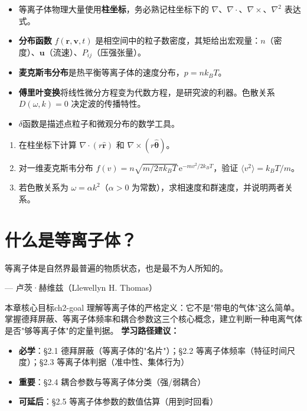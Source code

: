 \documentclass[12pt,a4paper,openany,oneside]{book}
\newcommand{\ee}{\mathrm{e}}
\newcommand{\vect}[1]{\bm{#1}}
\newcommand{\unitvec}[1]{\hat{\vect{#1}}}
\newcommand{\grad}{\nabla}
\newcommand{\curl}{\nabla\times}
\newcommand{\divg}{\nabla\cdot}
\newcommand{\lap}{\nabla^2}
\begin{document}
\begin{chapterreview}
\begin{itemize}
\item 等离子体物理大量使用\textbf{柱坐标}，务必熟记柱坐标下的 $\grad$、$\divg$、$\curl$、$\lap$ 表达式。
\item \textbf{分布函数} $f(\vect{r},\vect{v},t)$ 是相空间中的粒子数密度，其矩给出宏观量：$n$（密度）、$\vect{u}$（流速）、$P_{ij}$（压强张量）。
\item \textbf{麦克斯韦分布}是热平衡等离子体的速度分布，$p=nk_BT$。
\item \textbf{傅里叶变换}将线性微分方程变为代数方程，是研究波的利器。色散关系 $D(\omega,k)=0$ 决定波的传播特性。
\item $\delta$函数是描述点粒子和微观分布的数学工具。
\end{itemize}
\end{chapterreview}

\begin{miniquiz}
\begin{enumerate}
\item 在柱坐标下计算 $\divg(r\unitvec{r})$ 和 $\curl(r\unitvec{\theta})$。
\item 对一维麦克斯韦分布 $f(v) = n\sqrt{m/2\pi k_BT}\,\ee^{-mv^2/2k_BT}$，验证 $\langle v^2 \rangle = k_BT/m$。
\item 若色散关系为 $\omega = \alpha k^2$（$\alpha>0$ 为常数），求相速度和群速度，并说明两者关系。
\end{enumerate}
\end{miniquiz}


\chapter{什么是等离子体？}
\epigraph{等离子体是自然界最普遍的物质状态，也是最不为人所知的。}{--- 卢茨·赫维兹（Llewellyn H. Thomas）}

\begin{insight}{本章核心目标}{ch2-goal}
理解等离子体的严格定义：它不是"带电的气体"这么简单。掌握德拜屏蔽、等离子体频率和耦合参数这三个核心概念，建立判断一种电离气体是否"够等离子体"的定量判据。
\tcblower
\textbf{学习路径建议：}

\begin{itemize}[leftmargin=*]
\item[\textcolor{red}{$\blacksquare$}] \textbf{必学}：\S2.1 德拜屏蔽（等离子体的"名片"）；\S2.2 等离子体频率（特征时间尺度）；\S2.3 等离子体判据（准中性、集体行为）
\item[\textcolor{orange}{$\blacksquare$}] \textbf{重要}：\S2.4 耦合参数与等离子体分类（强/弱耦合）
\item[\textcolor{green}{$\blacksquare$}] \textbf{可延后}：\S2.5 等离子体参数的数值估算（用到时回看）
\end{itemize}
\end{insight}
\end{document}
